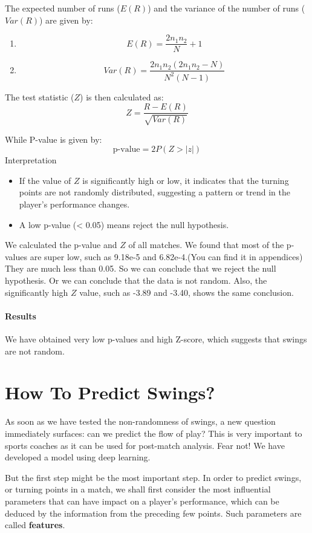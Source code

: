 \documentclass[UTF8]{mcmthesis}
\begin{document}
	The expected number of runs (\( E(R) \)) and the variance of the number of runs (\( Var(R) \)) are given by:
	\begin{enumerate}
		\item \[ E(R) = \frac{2n_1n_2}{N} + 1 \]
		\item \[ Var(R) = \frac{2n_1n_2(2n_1n_2 - N)}{N^2(N - 1)} \]
	\end{enumerate}
	
	The test statistic (\( Z \)) is then calculated as:
	\[ Z = \frac{R - E(R)}{\sqrt{Var(R)}} \]
	
	While P-value is given by:
	\[ \text{p-value} = 2P(Z > |z|) \]
	Interpretation	
	\begin{itemize}
		\item If the value of \( Z \) is significantly high or low, it indicates that the turning points are not randomly distributed, suggesting a pattern or trend in the player's performance changes.
		\item A low p-value (< 0.05) means reject the null hypothesis.
	\end{itemize}
	
    We calculated the p-value and \( Z \) of all matches. We found that most of the p-values are super low, such as 9.18e-5 and 6.82e-4.(You can find it in appendices) They are much less than 0.05. So we can conclude that we reject the null hypothesis. Or we can conclude that the data is not random. Also, the significantly high \( Z \) value, such as -3.89 and -3.40, shows the same conclusion.

	\paragraph{Results}
	We have obtained very low p-values and high Z-score, which suggests that swings are not random.
	
	\section{How To Predict Swings?}
	As soon as we have tested the non-randomness of swings, a new question immediately surfaces: can we predict the flow of play? This is very important to sports coaches as it can be used for post-match analysis. Fear not! We have developed a model using deep learning.
	
	But the first step might be the most important step. In order to predict swings, or turning points in a match, we shall first consider the most influential parameters that can have impact on a player’s performance, which can be deduced by the information from the preceding few points. Such parameters are called \textbf{features}.
	
\end{document}
